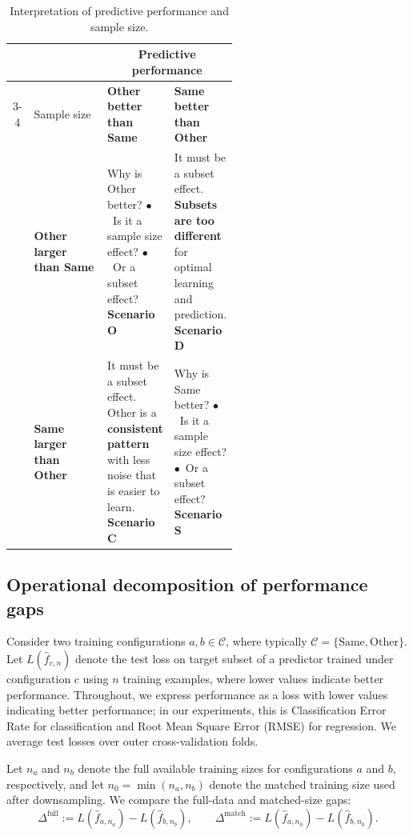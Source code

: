 \documentclass{article}
\begin{document}
\begin{table}[!t]
\centering
\small
\caption{Interpretation of predictive performance and sample size.}
\label{tab:scenario-interpretation}
\begin{tabular}{c l p{0.28\linewidth} p{0.28\linewidth}}
\toprule
& & \multicolumn{2}{c}{\textbf{Predictive performance}} \\
\cmidrule(lr){3-4}
& Sample size & \textbf{Other better than Same} & \textbf{Same better than Other} \\
\midrule
& \textbf{Other larger than Same}
& Why is Other better?
\newline $\bullet$\ Is it a sample size effect?
\newline $\bullet$\ Or a subset effect?
\newline \textbf{Scenario O}
& It must be a subset effect. \textbf{Subsets are too different} for optimal learning and prediction.
\newline \textbf{Scenario D} \\
\addlinespace
& \textbf{Same larger than Other}
& It must be a subset effect. Other is a \textbf{consistent pattern} with less noise that is easier to learn.
\newline \textbf{Scenario C}
& Why is Same better?
\newline $\bullet$\ Is it a sample size effect?
\newline $\bullet$\ Or a subset effect?
\newline \textbf{Scenario S} \\
\bottomrule
\end{tabular}
\end{table}


\subsection{Operational decomposition of performance gaps}
Consider two training configurations $a,b \in \mathcal C$, where typically
$\mathcal C=\{\mathrm{Same},\mathrm{Other}\}$.
Let $L(\hat f_{c,n})$ denote the test loss on target subset of a predictor trained under configuration $c$ using $n$ training examples, where lower values indicate better performance.
Throughout, we express performance as a loss with lower values indicating better performance; in our experiments, this is Classification Error Rate for classification and Root Mean Square Error (RMSE) for regression.
We average test losses over outer cross-validation folds.

Let $n_a$ and $n_b$ denote the full available training sizes for configurations $a$ and $b$, respectively, and let $n_0 = \min(n_a,n_b)$ denote the matched training size used after downsampling.
We compare the full-data and matched-size gaps:
\begin{equation}
\Delta^{\mathrm{full}}
:=
L(\hat f_{a,n_a}) - L(\hat f_{b,n_b}),
\qquad
\Delta^{\mathrm{match}}
:=
L(\hat f_{a,n_0}) - L(\hat f_{b,n_0}).
\label{eq:gaps}
\end{equation}
\end{document}
